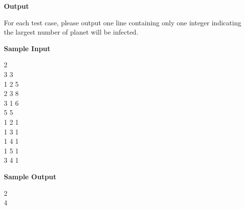 \begin{flushleft}
{\color{red} \textbf{Output}}
\end{flushleft}
For each test case, please output one line containing only one integer indicating the largest number of planet will be infected.

\begin{flushleft}
{\color{red} \textbf{Sample Input}}
\end{flushleft}
\begin{flushleft}
2\\
3 3\\
1 2 5\\
2 3 8\\
3 1 6\\
5 5\\
1 2 1\\
1 3 1\\
1 4 1\\
1 5 1\\
3 4 1\\
\end{flushleft}

\begin{flushleft}
{\color{red} \textbf{Sample Output}}
\end{flushleft}
\begin{flushleft}
2\\
4\\
\end{flushleft}

\newpage